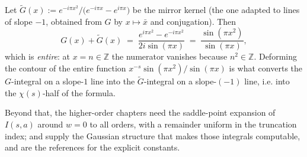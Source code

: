 \begin{remark}
\label{rem:rs_mirror}
Let $\widetilde G(x):=e^{-i\pi x^{2}}/\bigl(e^{-i\pi x}-e^{i\pi x}\bigr)$ be the mirror
kernel (the one adapted to lines of slope $-1$, obtained from $G$ by
$x\mapsto\bar x$ and conjugation).  Then
\[
  G(x)+\widetilde G(x)\;=\;\frac{e^{i\pi x^{2}}-e^{-i\pi x^{2}}}{2i\sin(\pi x)}
  \;=\;\frac{\sin(\pi x^{2})}{\sin(\pi x)},
\]
which is \emph{entire}: at $x=n\in\mathbb{Z}$ the numerator vanishes because
$n^{2}\in\mathbb{Z}$.  Deforming the contour of the entire function
$x^{-s}\sin(\pi x^{2})/\sin(\pi x)$ is what converts the $G$-integral on a slope-$1$ line
into the $\widetilde G$-integral on a slope-$(-1)$ line, i.e. into the $\chi(s)$-half of
the formula.
\end{remark}

Beyond that, the higher-order chapters need the saddle-point expansion of
$I(s,a)$ around $w=0$ to all orders, with a remainder uniform in the truncation index;
 and  supply the Gaussian structure that
makes those integrals computable, and \cite{Gabcke,AriasDeReyna2011} are the references
for the explicit constants.
